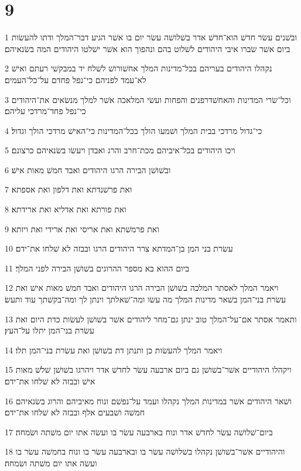 \chapter{9}

\par 1 ובשׁנים עשׂר חדשׁ הוא־חדשׁ אדר בשׁלושׁה עשׂר יום בו אשׁר הגיע דבר־המלך ודתו להעשׂות ביום אשׁר שׂברו איבי היהודים לשׁלוט בהם ונהפוך הוא אשׁר ישׁלטו היהודים המה בשׂנאיהם׃
\par 2 נקהלו היהודים בעריהם בכל־מדינות המלך אחשׁורושׁ לשׁלח יד במבקשׁי רעתם ואישׁ לא־עמד לפניהם כי־נפל פחדם על־כל־העמים׃
\par 3 וכל־שׂרי המדינות והאחשׁדרפנים והפחות ועשׂי המלאכה אשׁר למלך מנשׂאים את־היהודים כי־נפל פחד־מרדכי עליהם׃
\par 4 כי־גדול מרדכי בבית המלך ושׁמעו הולך בכל־המדינות כי־האישׁ מרדכי הולך וגדול׃
\par 5 ויכו היהודים בכל־איביהם מכת־חרב והרג ואבדן ויעשׂו בשׂנאיהם כרצונם׃
\par 6 ובשׁושׁן הבירה הרגו היהודים ואבד חמשׁ מאות אישׁ׃
\par 7 ואת פרשׁנדתא ואת דלפון ואת אספתא׃
\par 8 ואת פורתא ואת אדליא ואת ארידתא׃
\par 9 ואת פרמשׁתא ואת אריסי ואת ארידי ואת ויזתא׃
\par 10 עשׂרת בני המן בן־המדתא צרר היהודים הרגו ובבזה לא שׁלחו את־ידם׃
\par 11 ביום ההוא בא מספר ההרוגים בשׁושׁן הבירה לפני המלך׃
\par 12 ויאמר המלך לאסתר המלכה בשׁושׁן הבירה הרגו היהודים ואבד חמשׁ מאות אישׁ ואת עשׂרת בני־המן בשׁאר מדינות המלך מה עשׂו ומה־שׁאלתך וינתן לך ומה־בקשׁתך עוד ותעשׂ׃
\par 13 ותאמר אסתר אם־על־המלך טוב ינתן גם־מחר ליהודים אשׁר בשׁושׁן לעשׂות כדת היום ואת עשׂרת בני־המן יתלו על־העץ׃
\par 14 ויאמר המלך להעשׂות כן ותנתן דת בשׁושׁן ואת עשׂרת בני־המן תלו׃
\par 15 ויקהלו היהודיים אשׁר־בשׁושׁן גם ביום ארבעה עשׂר לחדשׁ אדר ויהרגו בשׁושׁן שׁלשׁ מאות אישׁ ובבזה לא שׁלחו את־ידם׃
\par 16 ושׁאר היהודים אשׁר במדינות המלך נקהלו ועמד על־נפשׁם ונוח מאיביהם והרוג בשׂנאיהם חמשׁה ושׁבעים אלף ובבזה לא שׁלחו את־ידם׃
\par 17 ביום־שׁלושׁה עשׂר לחדשׁ אדר ונוח בארבעה עשׂר בו ועשׂה אתו יום משׁתה ושׂמחה׃
\par 18 והיהודיים אשׁר־בשׁושׁן נקהלו בשׁלושׁה עשׂר בו ובארבעה עשׂר בו ונוח בחמשׁה עשׂר בו ועשׂה אתו יום משׁתה ושׂמחה׃
